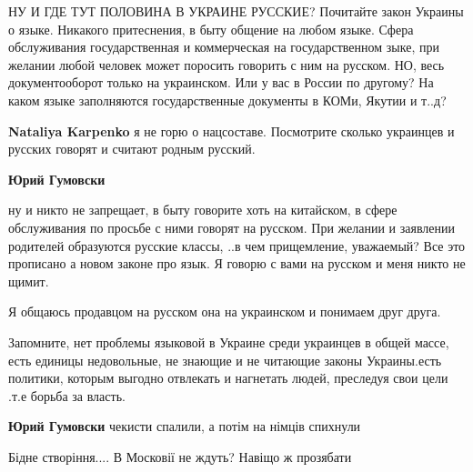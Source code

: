 \begin{itemize}
НУ И ГДЕ ТУТ ПОЛОВИНА В УКРАИНЕ РУССКИЕ? Почитайте закон Украины о языке.
Никакого притеснения, в быту общение на любом языке. Сфера обслуживания
государственная и коммерческая на государственном зыке, при желании любой
человек может поросить говорить с ним на русском. НО, весь документооборот
только на украинском. Или у вас в России по другому? На каком языке заполняются
государственные документы в КОМи, Якутии и т..д?


\textbf{Nataliya Karpenko} я не горю о нацсоставе. Посмотрите сколько украинцев и русских говорят и считают родным русский.


\textbf{Юрий Гумовски} 

ну и никто не запрещает, в быту говорите хоть на китайском, в сфере
обслуживания по просьбе с ними говорят на русском. При желании и заявлении
родителей образуются русские классы, ..в чем прищемление, уважаемый? Все это
прописано а новом законе про язык. Я говорю с вами на русском и меня никто не
щимит. 

Я общаюсь продавцом на русском она на украинском и понимаем друг друга.

Запомните, нет проблемы языковой в Украине среди украинцев в общей массе, есть
единицы недовольные, не знающие и не читающие законы Украины.есть политики,
которым выгодно отвлекать и нагнетать людей, преследуя свои цели .т.е борьба за
власть.


\textbf{Юрий Гумовски} чекисти спалили, а потім на німців спихнули

\end{itemize}


Бідне створіння.... В Московії не ждуть? Навіщо ж прозябати



